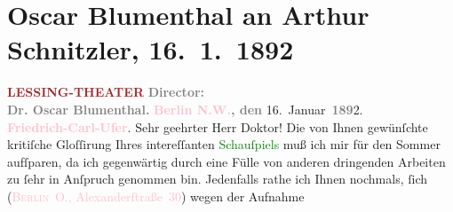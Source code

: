 

               \section[Oscar Blumenthal an Arthur Schnitzler, 16. 1. 1892]{ Oscar Blumenthal an Arthur Schnitzler, 16. 1. 1892}\nopagebreak{}\rehead{ }\normalsize\beginnumbering{} \toendnotes[C]{\smallbreak\pagebreak[2]} 
\toendnotes[C]{\smallbreak}\pstart
           \noindent{}\centering{}{\pb}\textcolor{gray}{\textbf{\textcolor{brown}{LESSING-THEATER}{}\ledrightnote{\textcolor{brown}{Lessing-Theater}}}}\pend
           \pstart
           \noindent{}\centering{}\textcolor{gray}{\textbf{Director:}}{\\}\textcolor{gray}{\textbf{Dr. Oscar Blumenthal.}}\pend
           \pstart
           \noindent{}\raggedleft{}\textcolor{gray}{\textbf{\textcolor{pink}{Berlin N.W.}{}\ledrightnote{\textcolor{pink}{Berlin}}, den}}{ }16. Januar \textcolor{gray}{\textbf{189}}2.{\\}\textcolor{gray}{\textbf{\textcolor{pink}{Friedrich-Carl-Ufer}{}\ledrightnote{\textcolor{pink}{Kapelle-Ufer}}}}.\pend
           \pstart\center{}Sehr geehrter Herr Doktor!\pend\pstart
           Die von Ihnen gewünſchte kritiſche Gloſſirung Ihres intereſſanten \textcolor{green}{Schauſpiels}{} muß ich mir für den
                  Sommer aufſparen, da ich gegenwärtig durch eine Fülle von anderen
               dringenden Arbeiten zu ſehr in Anſpruch genommen bin. Jedenfalls rathe ich Ihnen
               nochmals, ſich \label{K_L00062_1v}\label{K_L00062_1h} (\textcolor{pink}{\textsc{Berlin O.,} Alexanderſtraße 30}{}\ledrightnote{\textcolor{pink}{Alexanderstraße}}) wegen der Aufnahme
